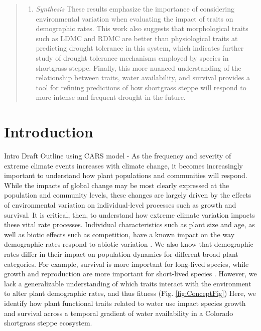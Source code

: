 \documentclass[12pt, letterpaper]{article}
\begin{document}
\begin{abstract}
\begin{enumerate}
\item \textit{Synthesis} These results emphasize the importance of considering environmental variation when evaluating the impact of traits on demographic rates. This work also suggests that morphological traits such as LDMC and RDMC are better than physiological traits at predicting drought tolerance in this system, which indicates further study of drought tolerance mechanisms employed by species in shortgrass steppe. Finally, this more nuanced understanding of the relationship between traits, water availability, and survival provides a tool for refining predictions of how shortgrass steppe will respond to more intense and frequent drought in the future.  
\end{enumerate}
\end{abstract}

\section{Introduction}

Intro Draft Outline using CARS model
-
As the frequency and severity of extreme climate events increases with climate change, it becomes increasingly important to understand how plant populations and communities will respond. While the impacts of global change may be most clearly expressed at the population and community levels, these changes are largely driven by the effects of environmental variation on individual-level processes such as growth and survival. It is critical, then, to understand how extreme climate variation impacts these vital rate processes. Individual characteristics such as plant size and age, as well as biotic effects such as competition, have a known impact on the way demographic rates respond to abiotic variation \citep{Adler2012, Tredennick2018}. We also know that demographic rates differ in their impact on population dynamics for different broad plant categories. For example,  survival is more important for long-lived species, while growth and reproduction are more important for short-lived species \citep{Adler2014}. However, we lack a generalizable understanding of which traits interact with the environment to alter plant demographic rates, and thus fitness \citep{Laughlin2018}(Fig. \ref{fig:ConceptFig}) Here, we identify how plant functional traits related to water use impact species growth and survival across a temporal gradient of water availability in a Colorado shortgrass steppe ecosystem. 
\end{document}
